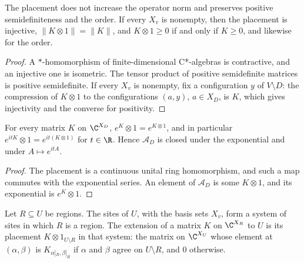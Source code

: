 \begin{lemma}
    \label{lem:sites_place_norm_order}
    \leanok
    The placement does not increase the operator norm and preserves positive
    semidefiniteness and the order. If every $X_v$ is nonempty, then the
    placement is injective, $\lVert K\otimes1\rVert=\lVert K\rVert$, and
    $K\otimes1\geq0$ if and only if $K\geq0$, and likewise for the order.
\end{lemma}
\begin{proof}\leanok
    A $*$-homomorphism of finite-dimensional C*-algebras is contractive, and an
    injective one is isometric. The tensor product of positive semidefinite
    matrices is positive semidefinite. If every $X_v$ is nonempty, fix a
    configuration $y$ of $V\setminus D$: the compression of $K\otimes1$ to the
    configurations $(a,y)$, $a\in X_D$, is $K$, which gives injectivity and
    the converse for positivity.
\end{proof}

\begin{lemma}
    \label{lem:sites_place_exp}
    \leanok
    For every matrix $K$ on $\C^{X_D}$, $e^{K}\otimes1=e^{K\otimes1}$, and in
    particular $e^{itK}\otimes1=e^{it(K\otimes1)}$ for $t\in\R$. Hence
    $\mathcal A_D$ is closed under the exponential and under $A\mapsto e^{itA}$.
\end{lemma}
\begin{proof}\leanok
    The placement is a continuous unital ring homomorphism, and such a map
    commutes with the exponential series. An element of $\mathcal A_D$ is some
    $K\otimes1$, and its exponential is $e^K\otimes1$.
\end{proof}

\begin{definition}
    \label{def:sites_subregion_place}
    \leanok
    Let $R\subseteq U$ be regions. The sites of $U$, with the basis sets $X_v$,
    form a system of sites in which $R$ is a region. The extension of a matrix $K$
    on $\C^{X_R}$ to $U$ is its placement $K\otimes1_{U\setminus R}$ in that system:
    the matrix on $\C^{X_U}$ whose element at $(\alpha,\beta)$ is
    $K_{\alpha|_R,\beta|_R}$ if $\alpha$ and $\beta$ agree on $U\setminus R$, and $0$
    otherwise.
\end{definition}

